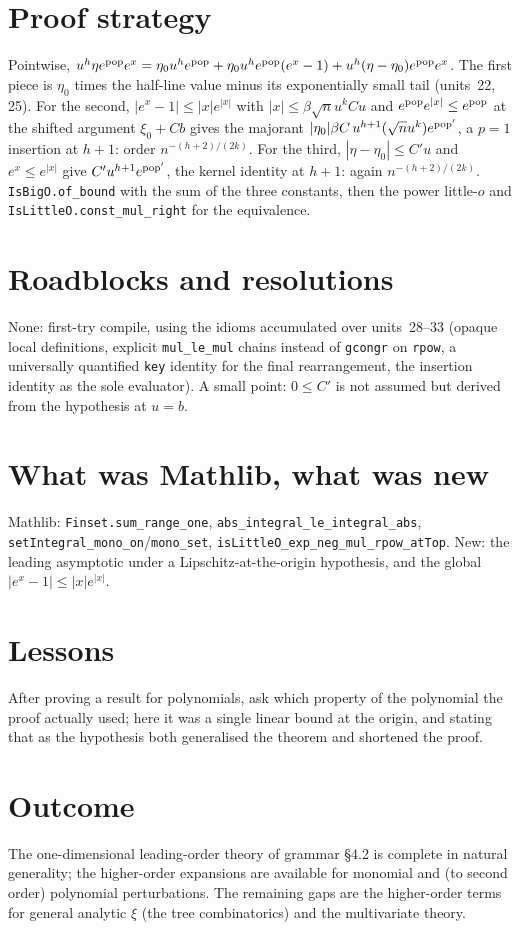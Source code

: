 \documentclass[11pt]{article}
\begin{document}
\section{Proof strategy}
Pointwise, $u^h\eta e^{\rm pop}e^{x}=\eta_0u^he^{\rm pop}+\eta_0u^he^{\rm pop}(e^x-1)+u^h(\eta-\eta_0)e^{\rm pop}e^{x}$.
The first piece is $\eta_0$ times the half-line value minus its exponentially small tail (units~22, 25).
For the second, $|e^x-1|\le|x|e^{|x|}$ with $|x|\le\beta\sqrt nu^kCu$ and
$e^{\rm pop}e^{|x|}\le e^{\rm pop}$ at the shifted argument $\xi_0+Cb$ gives the majorant
$|\eta_0|\beta C\,u^{h+1}(\sqrt nu^k)e^{{\rm pop}'}$, a $p=1$ insertion at $h+1$: order $n^{-(h+2)/(2k)}$.
For the third, $|\eta-\eta_0|\le C'u$ and $e^{x}\le e^{|x|}$ give $C'u^{h+1}e^{{\rm pop}'}$, the kernel
identity at $h+1$: again $n^{-(h+2)/(2k)}$. \texttt{IsBigO.of\_bound} with the sum of the three constants,
then the power little-$o$ and \texttt{IsLittleO.const\_mul\_right} for the equivalence.

\section{Roadblocks and resolutions}
None: first-try compile, using the idioms accumulated over units~28--33 (opaque local definitions,
explicit \texttt{mul\_le\_mul} chains instead of \texttt{gcongr} on \texttt{rpow}, a universally
quantified \texttt{key} identity for the final rearrangement, the insertion identity as the sole
evaluator). A small point: $0\le C'$ is not assumed but derived from the hypothesis at $u=b$.

\section{What was Mathlib, what was new}
Mathlib: \texttt{Finset.sum\_range\_one}, \texttt{abs\_integral\_le\_integral\_abs},
\texttt{setIntegral\_mono\_on}/\texttt{mono\_set}, \texttt{isLittleO\_exp\_neg\_mul\_rpow\_atTop}. New: the
leading asymptotic under a Lipschitz-at-the-origin hypothesis, and the global $|e^x-1|\le|x|e^{|x|}$.

\section{Lessons}
After proving a result for polynomials, ask which property of the polynomial the proof actually used;
here it was a single linear bound at the origin, and stating that as the hypothesis both generalised
the theorem and shortened the proof.

\section{Outcome}
The one-dimensional leading-order theory of grammar \S4.2 is complete in natural generality; the
higher-order expansions are available for monomial and (to second order) polynomial perturbations. The
remaining gaps are the higher-order terms for general analytic $\xi$ (the tree combinatorics) and the
multivariate theory.
\end{document}
